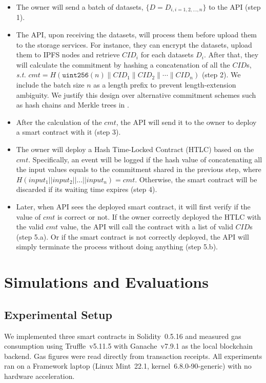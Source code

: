 \documentclass{svproc}
\begin{document}
\begin{itemize}
    \item The owner will send a batch of datasets, $\{D={D_{i,i=1,2,...,n}}\}$ to the API (step 1).
    \item The API, upon receiving the datasets, will process them before upload them to the storage services. For instance, they can encrypt the datasets, upload them to IPFS nodes and retrieve $CID_i$ for each datasets $D_i$. After that, they will calculate the commitment by hashing a concatenation of all the $CID$s, \textit{s.t.} $cmt = H(\texttt{uint256}(n) \| CID_1 \| CID_2 \| \cdots \| CID_n)$ (step 2). We include the batch size $n$ as a length prefix to prevent length-extension ambiguity. We justify this design over alternative commitment schemes such as hash chains and Merkle trees in .
    \item After the calculation of the $cmt$, the API will send it to the owner to deploy a smart contract with it (step 3).
    \item The owner will deploy a Hash Time-Locked Contract (HTLC) based on the $cmt$. Specifically, an event will be logged if the hash value of concatenating all the input values equals to the commitment shared in the previous step, where $H(input_1 || input_2 || ... || input_n) = cmt$. Otherwise, the smart contract will be discarded if its waiting time expires (step 4). 
    \item Later, when API sees the deployed smart contract, it will first verify if the value of $cmt$ is correct or not. If the owner correctly deployed the HTLC with the valid $cmt$ value, the API will call the contract with a list of valid $CID$s (step 5.a). Or if the smart contract is not correctly deployed, the API will simply terminate the process without doing anything (step 5.b).
\end{itemize}

\section{Simulations and Evaluations}
\label{sec:evaluation}

\subsection{Experimental Setup}

We implemented three smart contracts in Solidity~0.5.16 and measured gas consumption using Truffle~v5.11.5 with Ganache~v7.9.1 as the local blockchain backend. Gas figures were read directly from transaction receipts. All experiments ran on a Framework laptop (Linux Mint~22.1, kernel~6.8.0-90-generic) with no hardware acceleration.
\end{document}
